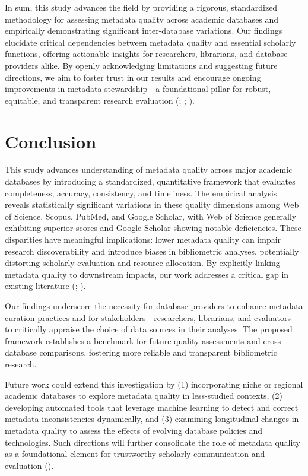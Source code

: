 \documentclass[
  12pt,
]{article}
\begin{document}
In sum, this study advances the field by providing a rigorous,
standardized methodology for assessing metadata quality across academic
databases and empirically demonstrating significant inter-database
variations. Our findings elucidate critical dependencies between
metadata quality and essential scholarly functions, offering actionable
insights for researchers, librarians, and database providers alike. By
openly acknowledging limitations and suggesting future directions, we
aim to foster trust in our results and encourage ongoing improvements in
metadata stewardship---a foundational pillar for robust, equitable, and
transparent research evaluation (; ;
).

\section{Conclusion}\label{conclusion-1}

This study advances understanding of metadata quality across major
academic databases by introducing a standardized, quantitative framework
that evaluates completeness, accuracy, consistency, and timeliness. The
empirical analysis reveals statistically significant variations in these
quality dimensions among Web of Science, Scopus, PubMed, and Google
Scholar, with Web of Science generally exhibiting superior scores and
Google Scholar showing notable deficiencies. These disparities have
meaningful implications: lower metadata quality can impair research
discoverability and introduce biases in bibliometric analyses,
potentially distorting scholarly evaluation and resource allocation. By
explicitly linking metadata quality to downstream impacts, our work
addresses a critical gap in existing literature
(; ).

Our findings underscore the necessity for database providers to enhance
metadata curation practices and for stakeholders---researchers,
librarians, and evaluators---to critically appraise the choice of data
sources in their analyses. The proposed framework establishes a
benchmark for future quality assessments and cross-database comparisons,
fostering more reliable and transparent bibliometric research.

Future work could extend this investigation by (1) incorporating niche
or regional academic databases to explore metadata quality in
less-studied contexts, (2) developing automated tools that leverage
machine learning to detect and correct metadata inconsistencies
dynamically, and (3) examining longitudinal changes in metadata quality
to assess the effects of evolving database policies and technologies.
Such directions will further consolidate the role of metadata quality as
a foundational element for trustworthy scholarly communication and
evaluation ().
\end{document}

